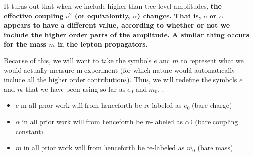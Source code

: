 It turns out that when we include higher than tree level amplitudes, \textbf{the effective coupling $e^2$ (or equivalently, $\alpha$) changes. That is, $e$ or $\alpha$ appears to have a different value, according to whether or not we include the higher order parts of the amplitude. A similar thing occurs for the mass $m$ in the lepton propagators.}

Because of this, we will want to take the symbols $e$ and $m$ to represent what we would actually measure in experiment (for which nature would automatically include all the higher order contributions). Thus, we will redefine the symbols $e$ and $m$ that we have been using so far as $e_0$ and $m_{0}$. .
\begin{qt}
    \begin{itemize}
        \item $e$ in all prior work will from henceforth be re-labeled as $e_{0}$ (bare charge) 
        \item $\alpha$ in all prior work will from henceforth be re-labeled as $\alpha 0$ (bare coupling constant)
        \item $m$ in all prior work will from henceforth be re-labeled as $m_{0}$ (bare mass)
    \end{itemize}
\end{qt}

